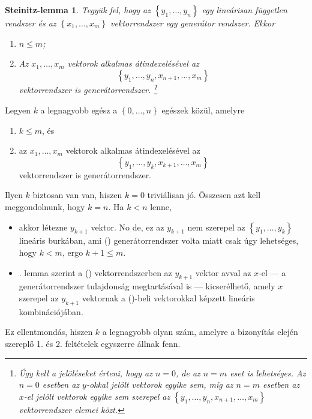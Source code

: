 \documentclass[9pt,showtrims]{memoir}
\makeatletter
\let\Aref\relax
\renewenvironment{proof}[1][\proofname]
    {\par\pushQED{\qed}%
    \normalfont \topsep6\p@\@plus6\p@\relax
    \trivlist
    \item[\hskip\labelsep
        \itshape
    #1\@addpunct{:}]\ignorespaces}
    {\popQED\endtrivlist\@endpefalse}
\theoremstyle{plain}
\newtheorem*{SL}{Steinitz-lemma}
\theoremstyle{remark}
\theoremstyle{definition}
\makeatother
\begin{document}
\begin{SL}
    Tegyük fel, hogy az $\left\{ y_1,\dots,y_n \right\}$ egy lineárisan független rendszer és az
    $\left\{ x_1,\dots,x_m \right\}$ vektorrendszer egy generátor rendszer.
    Ekkor
    \begin{enumerate}
        \item $n\leq m$;
        \item Az $x_1,\dots,x_m$ vektorok alkalmas átindexelésével az
            \[
                \left\{ y_1,\dots,y_n,x_{n+1},\dots,x_m \right\}
            \]
            vektorrendszer is generátorrendszer.%
            \footnote{Úgy kell a jelöléseket érteni, hogy az $n=0$, de az $n=m$ eset is lehetséges. 
                Az $n=0$ esetben az $y$-okkal jelölt vektorok egyike sem,
                míg az $n=m$ esetben az $x$-el jelölt vektorok egyike sem szerepel az 
                \(
                \left\{ y_1,\dots,y_n,x_{n+1},\dots,x_m \right\}
                \)
            vektorrendszer elemei közt.}%
            \qedhere
    \end{enumerate}
    \label{le:Stienitz}
\end{SL}
\begin{proof}
    Legyen $k$ a legnagyobb egész a $\left\{ 0,\dots,n \right\}$ egészek közül, amelyre
    \begin{enumerate}
        \item $k\leq m$, és
        \item az $x_1,\dots,x_m$ vektorok alkalmas átindexelésével az
            \[
                \left\{ y_1,\dots,y_k,x_{k+1},\dots,x_m \right\}\tag{\dag}
            \]
            vektorrendszer is generátorrendszer.
    \end{enumerate}
    Ilyen $k$ biztosan van van, hiszen $k=0$ triviálisan jó.
    Összesen azt kell meggondolnunk, hogy $k=n$.
    Ha $k<n$ lenne, 
    \begin{itemize}
        \item 
            akkor létezne $y_{k+1}$ vektor.
            No de, ez az $y_{k+1}$ nem szerepel az $\left\{ y_1,\dots,y_k \right\}$ lineáris burkában,
            ami (\dag) generátorrendszer volta miatt csak úgy lehetséges, hogy $k<m$, 
            ergo $k+1\leq m$.
        \item
            \Aref{le:gencsere}. lemma szerint a (\dag) vektorrendszerben az $y_{k+1}$ vektor 
            avval az $x$-el
            --- a generátorrendszer tulajdonság megtartásával is --- 
            kicserélhető, 
            amely $x$ szerepel az $y_{k+1}$ vektornak a (\dag)-beli
            vektorokkal képzett lineáris kombinációjában. 
    \end{itemize}
    Ez ellentmondás, hiszen $k$ a legnagyobb olyan szám, 
    amelyre a bizonyítás elején szereplő 1. és 2. feltételek egyszerre állnak fenn.
\end{proof}
\end{document}
